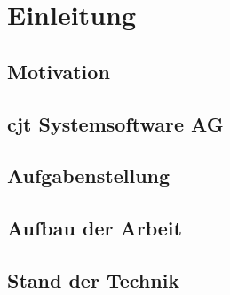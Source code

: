 
\chapter{Einleitung}
\section{Motivation}
\section{cjt Systemsoftware AG}
\section{Aufgabenstellung}
\section{Aufbau der Arbeit}
\section{Stand der Technik}